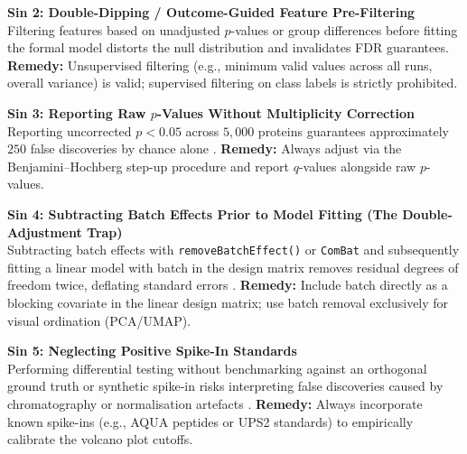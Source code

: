 \documentclass[11pt,twoside,openright]{book}
\begin{document}
\begin{pitfallbox}
\textbf{Sin 2: Double-Dipping / Outcome-Guided Feature Pre-Filtering}\\
Filtering features based on unadjusted $p$-values or group differences before fitting the formal model distorts the null distribution and invalidates FDR guarantees. \textbf{Remedy:} Unsupervised filtering (e.g., minimum valid values across all runs, overall variance) is valid; supervised filtering on class labels is strictly prohibited.
\end{pitfallbox}

\begin{pitfallbox}
\textbf{Sin 3: Reporting Raw $p$-Values Without Multiplicity Correction}\\
Reporting uncorrected $p < 0.05$ across $5,000$ proteins guarantees approximately $250$ false discoveries by chance alone \cite{benjamini1995controlling}. \textbf{Remedy:} Always adjust via the Benjamini--Hochberg step-up procedure and report $q$-values alongside raw $p$-values.
\end{pitfallbox}

\begin{pitfallbox}
\textbf{Sin 4: Subtracting Batch Effects Prior to Model Fitting (The Double-Adjustment Trap)}\\
Subtracting batch effects with \texttt{removeBatchEffect()} or \texttt{ComBat} \cite{johnson2007adjusting} and subsequently fitting a linear model with batch in the design matrix removes residual degrees of freedom twice, deflating standard errors \cite{leek2010tackling}. \textbf{Remedy:} Include batch directly as a blocking covariate in the linear design matrix; use batch removal exclusively for visual ordination (PCA/UMAP).
\end{pitfallbox}

\begin{pitfallbox}
\textbf{Sin 5: Neglecting Positive Spike-In Standards}\\
Performing differential testing without benchmarking against an orthogonal ground truth or synthetic spike-in risks interpreting false discoveries caused by chromatography or normalisation artefacts \cite{bruderer2017optimization, navarro2016multicenter}. \textbf{Remedy:} Always incorporate known spike-ins (e.g., AQUA peptides or UPS2 standards) to empirically calibrate the volcano plot cutoffs.
\end{pitfallbox}

\end{document}
